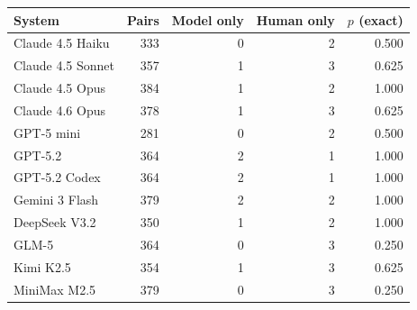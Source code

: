 \begin{tabular}{lrrrr}
\toprule
System & Pairs & Model only & Human only & $p$ (exact) \\
\midrule
Claude 4.5 Haiku & 333 & 0 & 2 & 0.500 \\
Claude 4.5 Sonnet & 357 & 1 & 3 & 0.625 \\
Claude 4.5 Opus & 384 & 1 & 2 & 1.000 \\
Claude 4.6 Opus & 378 & 1 & 3 & 0.625 \\
GPT-5 mini & 281 & 0 & 2 & 0.500 \\
GPT-5.2 & 364 & 2 & 1 & 1.000 \\
GPT-5.2 Codex & 364 & 2 & 1 & 1.000 \\
Gemini 3 Flash & 379 & 2 & 2 & 1.000 \\
DeepSeek V3.2 & 350 & 1 & 2 & 1.000 \\
GLM-5 & 364 & 0 & 3 & 0.250 \\
Kimi K2.5 & 354 & 1 & 3 & 0.625 \\
MiniMax M2.5 & 379 & 0 & 3 & 0.250 \\
\bottomrule
\end{tabular}
